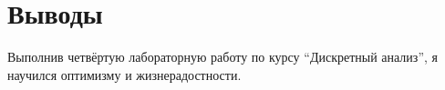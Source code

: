 \section{Выводы}

Выполнив четвёртую лабораторную работу по курсу \enquote{Дискретный анализ}, я научился оптимизму и жизнерадостности.

\pagebreak
